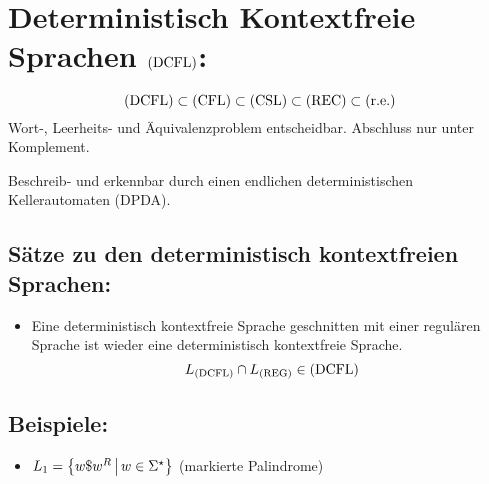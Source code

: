 \chapter{Deterministisch Kontextfreie Sprachen $\mathrm{(DCFL)}$:}
\begin{equation*}
	\mathrm{(DCFL)}\subset\mathrm{(CFL)}\subset\mathrm{(CSL)}\subset\mathrm{(REC)}\subset\mathrm{(r.e.)}
\end{equation*}
Wort-, Leerheits- und Äquivalenzproblem entscheidbar. Abschluss nur unter Komplement.

Beschreib- und erkennbar durch einen endlichen deterministischen Kellerautomaten (DPDA).

\section{Sätze zu den deterministisch kontextfreien Sprachen:}
\begin{itemize}
	\item Eine deterministisch kontextfreie Sprache geschnitten mit einer regulären Sprache ist wieder eine deterministisch kontextfreie Sprache.
	\begin{equation*}
		L_{\mathrm{(DCFL)}}\cap L_{\mathrm{(REG)}} \in \mathrm{(DCFL)}
\end{equation*}
\end{itemize}

\section{Beispiele: }
\begin{itemize}
	\item $L_1=\left\{ w\$w^R \,\middle|\, w\in\Sigma^\star \right\}$ (markierte Palindrome)
\end{itemize}

